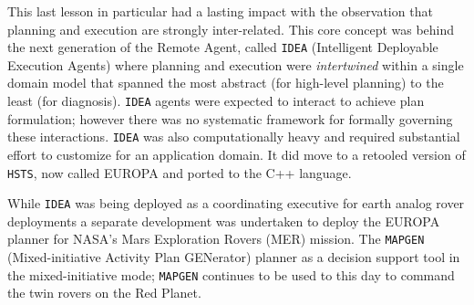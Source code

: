 This last lesson in particular had a lasting impact with the
observation that planning and execution are strongly
inter-related. This core concept was behind the next generation of the
Remote Agent, called \texttt{IDEA} (Intelligent Deployable Execution
Agents) where planning and execution were \emph{intertwined} within a
single domain model that spanned the most abstract (for high-level
planning) to the least (for diagnosis). \texttt{IDEA} \cite{mus02,
  mus04} agents were expected to interact to achieve plan formulation;
however there was no systematic framework for formally governing these
interactions. \texttt{IDEA} was also computationally heavy and
required substantial effort to customize for an application domain. It
did move to a retooled version of \texttt{HSTS}, now called EUROPA
\cite{frank2003, barreiro09} and ported to the C++ language.

While \texttt{IDEA} was being deployed as a coordinating executive for
earth analog rover deployments \cite{wetter05} a separate development
was undertaken to deploy the EUROPA planner for NASA’s Mars
Exploration Rovers (MER) mission. The \texttt{MAPGEN}
(Mixed-initiative Activity Plan GENerator) planner \cite{bresina03,
  aichang04, bresina05, bresina05a} as a decision support tool in the
mixed-initiative mode; \texttt{MAPGEN} continues to be used to this
day to command the twin rovers on the Red
Planet. %

